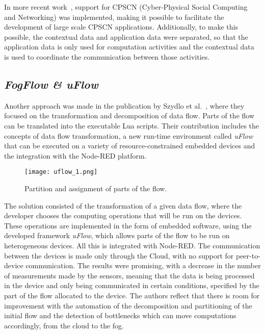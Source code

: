 In more recent work~\cite{exogenous_coordination}, support for CPSCN (Cyber-Physical Social Computing and Networking) was implemented, making it possible to facilitate the development of large scale CPSCN applications. Additionally, to make this possible, the contextual data and application data were separated, so that the application data is only used for computation activities and the contextual data is used to coordinate the communication between those activities.

\subsection{\textit{FogFlow \& uFlow}}\label{sec:decentralized_sota_uflow}

Another approach was made in the publication by Szydlo et al.~\cite{flow_based_programming_fog}, where they focused on the transformation and decomposition of data flow. Parts of the flow can be translated into the executable Lua scripts. Their contribution includes the concepts of data flow transformation, a new run-time environment called \textit{uFlow} that can be executed on a variety of resource-constrained embedded devices and the integration with the Node-RED platform. 

\begin{figure}[h]
\centering
\texttt{[image: uflow\_1.png]}
\caption[Partition and assignment of parts of the flow]{Partition and assignment of parts of the flow\cite{flow_based_programming_fog}.}\label{fig:uflow_1}
\end{figure}

The solution consisted of the transformation of a given data flow, where the developer chooses the computing operations that will be run on the devices. These operations are implemented in the form of embedded software, using the developed framework \textit{uFlow}, which allows parts of the flow to be run on heterogeneous devices. All this is integrated with Node-RED. The communication between the devices is made only through the Cloud, with no support for peer-to-device communication. The results were promising, with a decrease in the number of measurements made by the sensors, meaning that the data is being processed in the device and only being communicated in certain conditions, specified by the part of the flow allocated to the device. The authors reflect that there is room for improvement with the automation of the decomposition and partitioning of the initial flow and the detection of bottlenecks which can move computations accordingly, from the cloud to the fog.

